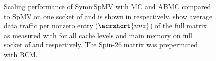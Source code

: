 \begin{figure}[t]
  	\caption{Scaling performance of \acrshort{SymmSpMV} with \acrshort{MC} and \acrshort{ABMC} compared to \acrshort{SpMV} on one socket of \IVB and \SKX is shown in  respectively.  show average data traffic per nonzero entry ($\acrshort{nnz}$) of the full matrix as measured with \LIKWID for all cache levels and main memory on full socket of \IVB and \SKX respectively. The Spin-26 matrix was prepermuted with \acrshort{RCM}.}
  	\label{fig:motivation}
  \end{figure}
 
